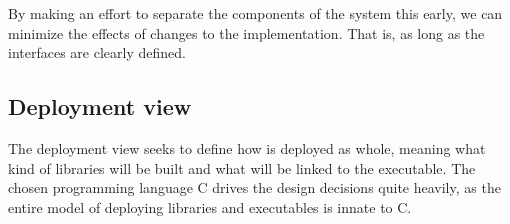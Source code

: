 By making an effort to separate the components of the system this early, we can
minimize the effects of changes to the implementation. That is, as long as the
interfaces are clearly defined.

\subsection{Deployment view}

The deployment view seeks to define how \pman is deployed as whole, meaning
what kind of libraries will be built and what will be linked to the executable.
The chosen programming language C drives the design decisions quite heavily,
as the entire model of deploying libraries and executables is innate to C.
